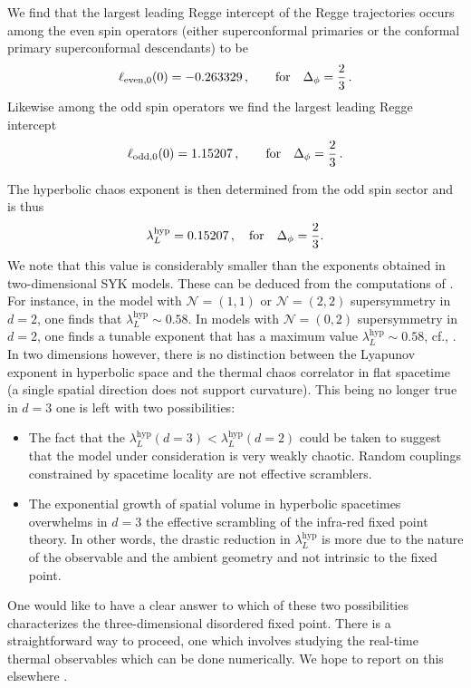 \documentclass[11pt]{article}
\begin{document}
We find that the largest leading Regge intercept of the Regge trajectories occurs among the even spin operators (either superconformal primaries or the conformal primary superconformal descendants) to be
%
\begin{equation}
\ell_{{\rm even},0}(0)=-0.263329\,, \qquad{\rm for}\quad \Delta_\phi=\frac{2}{3}\,.
\end{equation}	
%
Likewise among the odd spin operators we find the largest leading Regge intercept 
%
\begin{equation}
\ell_{{\rm odd},0}(0)=1.15207 \,, \qquad{\rm for}\quad \Delta_\phi=\frac{2}{3}\,.
\end{equation}	
% 

The hyperbolic chaos exponent is then determined from the odd spin sector and is thus
%
\begin{equation}\label{eq:hypLy}
\lambda_L^\text{hyp} = 0.15207\,, \quad{\rm for}\quad \Delta_\phi =\frac{2}{3}.
\end{equation}	
%
We note that this value is considerably smaller than the exponents obtained in two-dimensional SYK models. These can be deduced  from the computations of \cite{Murugan:2017eto}. For instance, in the model with $\mathcal{N} = (1,1)$ or $\mathcal{N}=(2,2)$ supersymmetry in $d=2$, one finds that $\lambda_L^\text{hyp} \sim 0.58$. In models with $\mathcal{N} = (0,2)$ supersymmetry in $d=2$, one finds a tunable exponent that has a maximum value $\lambda_L^\text{hyp} \sim 0.58$, cf., \cite{Peng:2018zap}.
In two dimensions however, there is no distinction between the Lyapunov exponent in hyperbolic space and the thermal chaos correlator in flat spacetime (a single spatial direction does not support curvature). This being no longer true in $d=3$ one is left with two possibilities:
\begin{itemize}
\item The fact that the $\lambda_L^\text{hyp} (d=3) < \lambda_L^\text{hyp} (d=2)$ could be taken to suggest that the model under consideration is very weakly chaotic. Random couplings constrained by spacetime locality are not effective scramblers. 
\item The exponential growth of spatial volume in hyperbolic spacetimes overwhelms in $d=3$ the effective scrambling of the infra-red fixed point theory. In other words, the drastic reduction in $\lambda_L^\text{hyp} $ is more due to the nature of the observable and the ambient geometry and not intrinsic to the fixed point. 
\end{itemize}
One would like to have a clear answer to which of these two possibilities characterizes the three-dimensional disordered fixed point. There is a straightforward way to proceed, one which involves studying the real-time thermal observables which can be done numerically. We hope to report on this elsewhere \cite{Chang:2021tch}.
\end{document}
